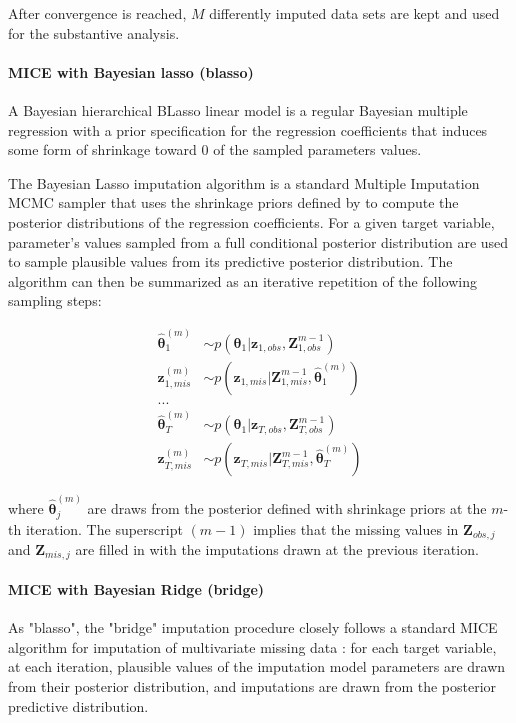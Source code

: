 	After convergence is reached, $M$ differently imputed data sets are kept and used for the substantive 
	analysis.

\paragraph{MICE with Bayesian lasso (blasso)}
	A Bayesian hierarchical BLasso linear model is a regular Bayesian multiple regression with a
	prior specification for the regression coefficients that induces some form of shrinkage toward 0 of
	the sampled parameters values.

	The Bayesian Lasso imputation algorithm is a standard Multiple Imputation MCMC sampler that uses the 
	shrinkage priors defined by \citet{hans:2010} to compute the posterior distributions of the regression
	coefficients. For a given target variable, parameter's values sampled from a full conditional 
	posterior distribution are used to sample plausible values from its predictive posterior distribution.
	The algorithm can then be summarized as an iterative repetition of the following sampling steps:

	\begin{equation}
	\begin{split}
	\hat{\bm{\theta}}_{1}^{(m)} &\sim p(\bm{\theta}_1 | \bm{z}_{1, obs}, \bm{Z}_{1, obs}^{m-1}) \\
	\bm{z}_{1, mis}^{(m)} &\sim p(\bm{z}_{1, mis} | \bm{Z}_{1, mis}^{m-1}, \hat{\bm{\theta}}_{1}^{(m)}) \\
	... \\
	\hat{\bm{\theta}}_{T}^{(m)} &\sim p(\bm{\theta}_1 | \bm{z}_{T, obs}, \bm{Z}_{T, obs}^{m-1}) \\
	\bm{z}_{T, mis}^{(m)} &\sim p(\bm{z}_{T, mis} | \bm{Z}_{T, mis}^{m-1}, \hat{\bm{\theta}}_{T}^{(m)}) 
	\end{split}
	\end{equation}

	where $\hat{\bm{\theta}}_{j}^{(m)}$ are draws from the posterior defined with shrinkage priors
	at the $m$-th iteration. The superscript $(m-1)$ implies that the missing values in $\bm{Z}_{obs, j}$
	and $\bm{Z}_{mis, j}$ are filled in with the imputations drawn at the previous iteration.

\paragraph{MICE with Bayesian Ridge (bridge)}
	As "blasso", the "bridge" imputation procedure closely follows a standard MICE algorithm for imputation of 
	multivariate missing data \citep[p. 120, algorithm 4.3]{vanBuuren:2012}: for each target variable, at each 
	iteration, plausible values of the imputation model parameters are drawn from their posterior distribution, 
	and imputations are drawn from the posterior predictive distribution. 

